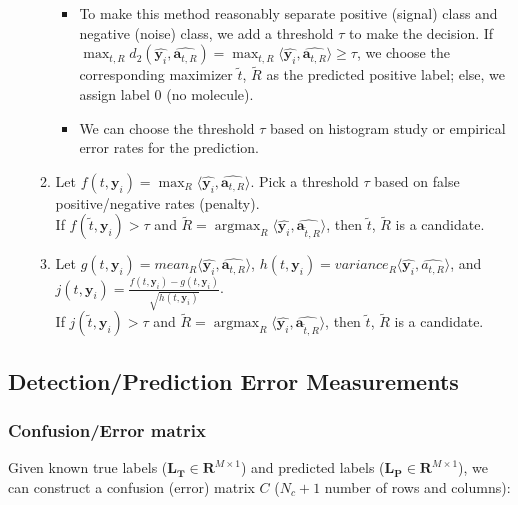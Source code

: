 \documentclass[11pt]{article}
\newcommand{\by}{\boldsymbol{y}}
\newcommand{\ba}{\boldsymbol{a}}
\DeclareMathOperator*{\argmax}{argmax}
\begin{document}
\begin{itemize}
\begin{enumerate}
\begin{itemize}
            \item To make this method reasonably separate positive (signal) class and negative (noise) class, we add a threshold $\tau$ to make the decision. If $\max_{t,R} d_{2}(\hat{\by_i}, \hat{\ba_{t,R}}) = \max_{t,R} \langle \hat{\by_i}, \hat{\ba_{t,R}} \rangle \ge \tau$, we choose the corresponding maximizer $\widetilde{t}$, $\widetilde{R}$ as the predicted positive label; else, we assign label $0$ (no molecule).
            \item We can choose the threshold $\tau$ based on histogram study or empirical error rates for the prediction.
        \end{itemize}
        \item Let $f(t,\by_i) = \max_R \langle \hat{\by_i}, \hat{\ba_{t,R}} \rangle$. Pick a threshold $\tau$ based on false positive/negative rates (penalty).\\
        If $f(\widetilde{t},\by_i) > \tau$ and $\widetilde{R} = \argmax_R \langle \hat{\by_i}, \hat{\ba_{\widetilde{t},R}} \rangle$, then $\widetilde{t}$, $\widetilde{R}$ is a candidate.
        \item Let $g(t,\by_i) = {mean}_R \langle \hat{\by_i}, \hat{\ba_{t,R}} \rangle$, $h(t,\by_i) = {variance}_R  \langle \hat{\by_i}, \hat{a_{t,R}} \rangle$, and $j(t,\by_i) = \frac{f(t,\by_i)-g(t,\by_i)}{\sqrt{h(t,\by_i)}}$. \\
        If $j(\widetilde{t},\by_i) > \tau$ and $\widetilde{R} = \argmax_R \langle \hat{\by_i}, \hat{\ba_{\widetilde{t},R}} \rangle$, then $\widetilde{t}$, $\widetilde{R}$ is a candidate.
    \end{enumerate}
    
    \end{itemize}
    
    \subsection{Detection/Prediction Error Measurements}
    
    \subsubsection{Confusion/Error matrix}
    Given known true labels ($\mathbf{L_T} \in \mathbf{R}^{M\times 1}$) and predicted labels ($\mathbf{L_P} \in \mathbf{R}^{M\times 1}$), we can construct a confusion (error) matrix $C$ ($N_c+1$ number of rows and columns):
    \\\\
    
\end{document}

